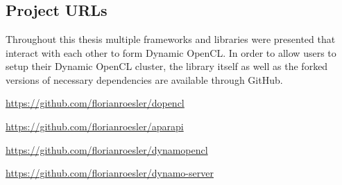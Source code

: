 \chapter{\appendixname}

\section*{Project URLs}
\label{appendix:links}
Throughout this thesis multiple frameworks and libraries were presented that interact with each other to form Dynamic OpenCL. In order to allow users to setup their Dynamic OpenCL cluster, the library itself as well as the forked versions of necessary dependencies are available through GitHub.

\begin{description}[align=left]
	\item [dOpenCL] \url{https://github.com/florianroesler/dopencl}
	\item [Aparapi] \url{https://github.com/florianroesler/aparapi}
	\item [Dynamic OpenCL] \url{https://github.com/florianroesler/dynamopencl}
	\item [Dynamic OpenCL Web Server Demo] \url{https://github.com/florianroesler/dynamo-server}
\end{description}

